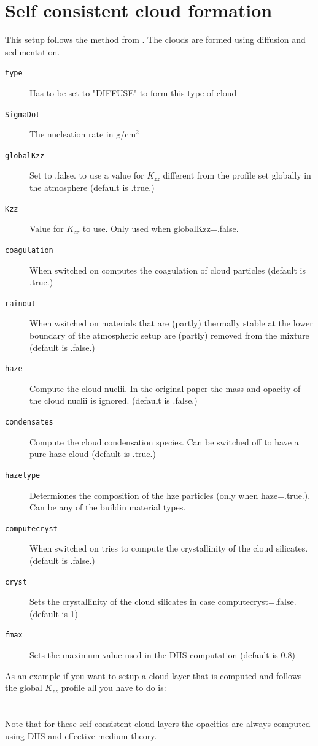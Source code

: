 \documentclass[12pt]{article}
\begin{document}
\section{Self consistent cloud formation}

This setup follows the method from \cite{2019A&A...622A.121O}. The clouds are formed using diffusion and sedimentation.

\begin{description}
\item[\texttt{type}]
Has to be set to "DIFFUSE" to form this type of cloud
\item[\texttt{SigmaDot}]
The nucleation rate in g/cm$^2$
\item[\texttt{globalKzz}]
Set to .false. to use a value for $K_{zz}$ different from the profile set globally in the atmosphere (default is .true.)
\item[\texttt{Kzz}]
Value for $K_{zz}$ to use. Only used when globalKzz=.false.
\item[\texttt{coagulation}] 
When switched on computes the coagulation of cloud particles (default is .true.)
\item[\texttt{rainout}] 
When wsitched on materials that are (partly) thermally stable at the lower boundary of the atmospheric setup are (partly) removed from the mixture (default is .false.)
\item[\texttt{haze}]
Compute the cloud nuclii. In the original paper the mass and opacity of the cloud nuclii is ignored. (default is .false.)
\item[\texttt{condensates}]
Compute the cloud condensation species. Can be switched off to have a pure haze cloud (default is .true.)
\item[\texttt{hazetype}]
Determiones the composition of the hze particles (only when haze=.true.). Can be any of the buildin material types.
\item[\texttt{computecryst}] 
When switched on tries to compute the crystallinity of the cloud silicates. (default is .false.)
\item[\texttt{cryst}]
Sets the crystallinity of the cloud silicates in case computecryst=.false. (default is 1)
\item[\texttt{fmax}]
Sets the maximum value used in the DHS computation (default is 0.8)
\end{description}

As an example if you want to setup a cloud layer that is computed and follows the global $K_{zz}$ profile all you have to do is:
\\
\\
\\
Note that for these self-consistent cloud layers the opacities are always computed using DHS and effective medium theory.
\end{document}
